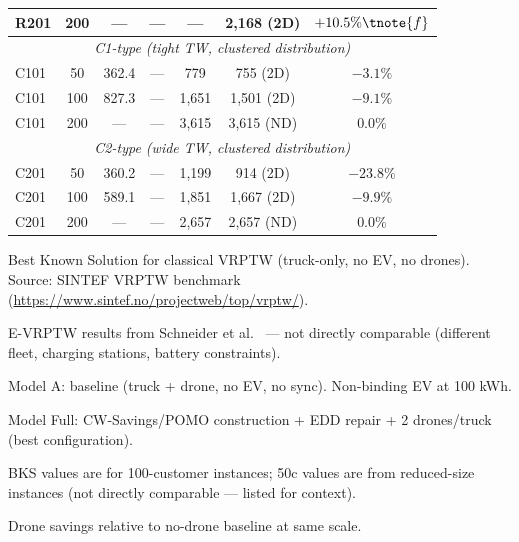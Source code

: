 \begin{table}[t]
\begin{tabular}{l c c c c c c}
R201 & 200 & — & — & — & 2,168 (2D) & $+10.5\%\tnote{f}$ \\
\midrule
\multicolumn{7}{c}{\textit{C1-type (tight TW, clustered distribution)}} \\
\midrule
C101 & 50  & 362.4\tnote{e} & — & 779 & 755 (2D) & $-3.1\%$ \\
C101 & 100 & 827.3\tnote{e} & — & 1,651 & 1,501 (2D) & $-9.1\%$ \\
C101 & 200 & — & — & 3,615 & 3,615 (ND) & $0.0\%$ \\
\midrule
\multicolumn{7}{c}{\textit{C2-type (wide TW, clustered distribution)}} \\
\midrule
C201 & 50  & 360.2\tnote{e} & — & 1,199 & 914 (2D) & $-23.8\%$ \\
C201 & 100 & 589.1\tnote{e} & — & 1,851 & 1,667 (2D) & $-9.9\%$ \\
C201 & 200 & — & — & 2,657 & 2,657 (ND) & $0.0\%$ \\
\bottomrule
\end{tabular}

\begin{tablenotes}
\footnotesize
\item[a] Best Known Solution for classical VRPTW (truck-only, no EV, no drones). Source: SINTEF VRPTW benchmark (\url{https://www.sintef.no/projectweb/top/vrptw/}).
\item[b] E-VRPTW results from Schneider et al.~\cite{schneider2014evrp} — not directly comparable (different fleet, charging stations, battery constraints).
\item[c] Model A: baseline (truck + drone, no EV, no sync). Non-binding EV at 100 kWh.
\item[d] Model Full: CW-Savings/POMO construction + EDD repair + 2 drones/truck (best configuration).
\item[e] BKS values are for 100-customer instances; 50c values are from reduced-size instances (not directly comparable — listed for context).
\item[f] Drone savings relative to no-drone baseline at same scale.
\end{tablenotes}
\end{table}
